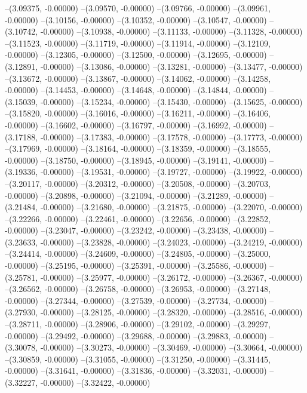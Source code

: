 --(3.09375, -0.00000)
--(3.09570, -0.00000)
--(3.09766, -0.00000)
--(3.09961, -0.00000)
--(3.10156, -0.00000)
--(3.10352, -0.00000)
--(3.10547, -0.00000)
--(3.10742, -0.00000)
--(3.10938, -0.00000)
--(3.11133, -0.00000)
--(3.11328, -0.00000)
--(3.11523, -0.00000)
--(3.11719, -0.00000)
--(3.11914, -0.00000)
--(3.12109, -0.00000)
--(3.12305, -0.00000)
--(3.12500, -0.00000)
--(3.12695, -0.00000)
--(3.12891, -0.00000)
--(3.13086, -0.00000)
--(3.13281, -0.00000)
--(3.13477, -0.00000)
--(3.13672, -0.00000)
--(3.13867, -0.00000)
--(3.14062, -0.00000)
--(3.14258, -0.00000)
--(3.14453, -0.00000)
--(3.14648, -0.00000)
--(3.14844, -0.00000)
--(3.15039, -0.00000)
--(3.15234, -0.00000)
--(3.15430, -0.00000)
--(3.15625, -0.00000)
--(3.15820, -0.00000)
--(3.16016, -0.00000)
--(3.16211, -0.00000)
--(3.16406, -0.00000)
--(3.16602, -0.00000)
--(3.16797, -0.00000)
--(3.16992, -0.00000)
--(3.17188, -0.00000)
--(3.17383, -0.00000)
--(3.17578, -0.00000)
--(3.17773, -0.00000)
--(3.17969, -0.00000)
--(3.18164, -0.00000)
--(3.18359, -0.00000)
--(3.18555, -0.00000)
--(3.18750, -0.00000)
--(3.18945, -0.00000)
--(3.19141, -0.00000)
--(3.19336, -0.00000)
--(3.19531, -0.00000)
--(3.19727, -0.00000)
--(3.19922, -0.00000)
--(3.20117, -0.00000)
--(3.20312, -0.00000)
--(3.20508, -0.00000)
--(3.20703, -0.00000)
--(3.20898, -0.00000)
--(3.21094, -0.00000)
--(3.21289, -0.00000)
--(3.21484, -0.00000)
--(3.21680, -0.00000)
--(3.21875, -0.00000)
--(3.22070, -0.00000)
--(3.22266, -0.00000)
--(3.22461, -0.00000)
--(3.22656, -0.00000)
--(3.22852, -0.00000)
--(3.23047, -0.00000)
--(3.23242, -0.00000)
--(3.23438, -0.00000)
--(3.23633, -0.00000)
--(3.23828, -0.00000)
--(3.24023, -0.00000)
--(3.24219, -0.00000)
--(3.24414, -0.00000)
--(3.24609, -0.00000)
--(3.24805, -0.00000)
--(3.25000, -0.00000)
--(3.25195, -0.00000)
--(3.25391, -0.00000)
--(3.25586, -0.00000)
--(3.25781, -0.00000)
--(3.25977, -0.00000)
--(3.26172, -0.00000)
--(3.26367, -0.00000)
--(3.26562, -0.00000)
--(3.26758, -0.00000)
--(3.26953, -0.00000)
--(3.27148, -0.00000)
--(3.27344, -0.00000)
--(3.27539, -0.00000)
--(3.27734, -0.00000)
--(3.27930, -0.00000)
--(3.28125, -0.00000)
--(3.28320, -0.00000)
--(3.28516, -0.00000)
--(3.28711, -0.00000)
--(3.28906, -0.00000)
--(3.29102, -0.00000)
--(3.29297, -0.00000)
--(3.29492, -0.00000)
--(3.29688, -0.00000)
--(3.29883, -0.00000)
--(3.30078, -0.00000)
--(3.30273, -0.00000)
--(3.30469, -0.00000)
--(3.30664, -0.00000)
--(3.30859, -0.00000)
--(3.31055, -0.00000)
--(3.31250, -0.00000)
--(3.31445, -0.00000)
--(3.31641, -0.00000)
--(3.31836, -0.00000)
--(3.32031, -0.00000)
--(3.32227, -0.00000)
--(3.32422, -0.00000)
